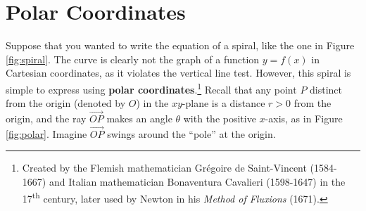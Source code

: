 \section{Polar Coordinates}
Suppose that you wanted to write the equation of a spiral, like the one in
Figure \ref{fig:spiral}. The curve is clearly not the graph of a function $y=f(x)$ in
Cartesian coordinates, as it violates the vertical line test. However, this
spiral is simple to express using
\textbf{polar coordinates}.\footnote{Created by the Flemish mathematician
Gr\'{e}goire de Saint-Vincent (1584-1667) and Italian mathematician Bonaventura
Cavalieri (1598-1647) in the 17\textsuperscript{th} century, later used by
Newton in his \emph{Method of Fluxions} (1671).}
Recall that any point $P$ distinct from the origin (denoted by $O$) in the
$xy$-plane is a distance $r>0$ from the origin, and the ray
$\overrightarrow{OP}$ makes an angle $\theta$ with the positive $x$-axis, as in
Figure \ref{fig:polar}. Imagine $\overrightarrow{OP}$ swings around the ``pole''
at the origin.

